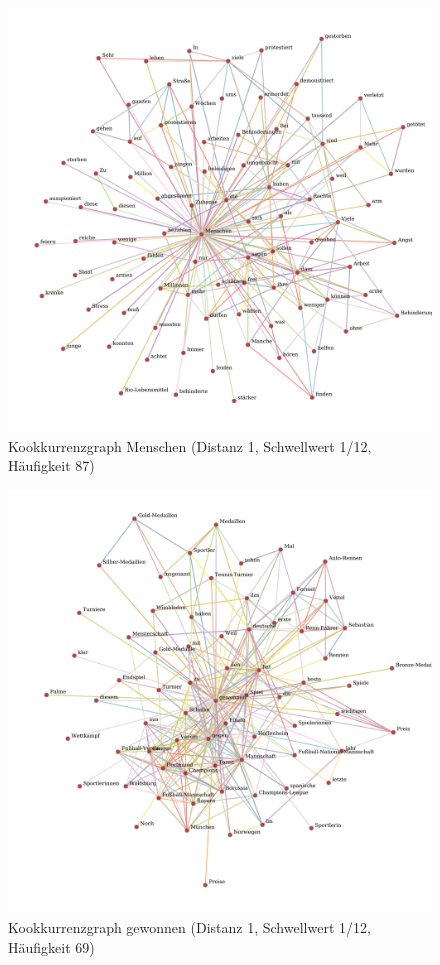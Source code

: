 \documentclass[11pt, a4paper]{article}
\begin{document}
\begin{figure}[hp!]
    \centering
        \includegraphics[scale=.4]{../../data/results/cooc_nl/topwords/graph_Menschen.pdf}
    \caption{Kookkurrenzgraph Menschen (Distanz 1, Schwellwert 1/12, Häufigkeit 87)}
    \label{fig:hw-menschen}
\end{figure}

\begin{figure}[hp!]
    \centering
        \includegraphics[scale=.4]{../../data/results/cooc_nl/topwords/graph_gewonnen.pdf}
    \caption{Kookkurrenzgraph gewonnen (Distanz 1, Schwellwert 1/12, Häufigkeit 69)}
    \label{fig:hw-gewonnen}
\end{figure}
\end{document}
